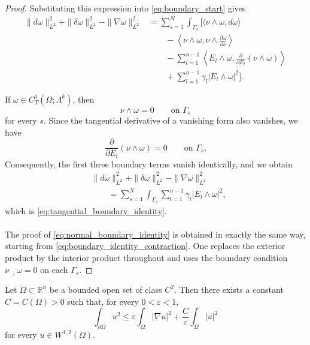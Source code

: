 \begin{proof}
Substituting this expression into \eqref{eq:boundary_start} gives
\[
\begin{aligned}
\|d\omega\|_{L^2}^2+\|\delta\omega\|_{L^2}^2-\|\nabla\omega\|_{L^2}^2
&=
\sum_{s=1}^N
\int_{\Gamma_s}
\Bigg[
\langle\nu\wedge\omega,d\omega\rangle
\\
&\qquad-
\left\langle
\nu\wedge\omega,
\nu\wedge\frac{\partial\omega}{\partial\nu}
\right\rangle
\\
&\qquad-
\sum_{l=1}^{n-1}
\left\langle
E_l\wedge\omega,
\frac{\partial}{\partial E_l}
(\nu\wedge\omega)
\right\rangle
\\
&\qquad+
\sum_{l=1}^{n-1}
\gamma_l|E_l\wedge\omega|^2
\Bigg].
\end{aligned}
\]

If $\omega\in C_T^1(\Omega;\Lambda^k)$, then
\[
\nu\wedge\omega=0
\qquad\text{on }\Gamma_s
\]
for every $s$. Since the tangential derivative of a vanishing form
also vanishes, we have
\[
\frac{\partial}{\partial E_l}(\nu\wedge\omega)=0
\qquad\text{on }\Gamma_s.
\]
Consequently, the first three boundary terms vanish identically, and
we obtain
\[
\begin{aligned}
&\|d\omega\|_{L^2}^2+\|\delta\omega\|_{L^2}^2-\|\nabla\omega\|_{L^2}^2
\\
&\qquad=
\sum_{s=1}^N
\int_{\Gamma_s}
\sum_{l=1}^{n-1}
\gamma_l|E_l\wedge\omega|^2,
\end{aligned}
\]
which is \eqref{eq:tangential_boundary_identity}.
\\\\ The proof of \eqref{eq:normal_boundary_identity} is obtained in
exactly the same way, starting from
\eqref{eq:boundary_identity_contraction}. One replaces the exterior
product by the interior product throughout and uses the boundary
condition $\nu\lrcorner\omega=0$ on each $\Gamma_s$.
\end{proof}

\begin{proposition}
\label{prop:trace_estimate}
Let $\Omega\subset\mathbb{R}^n$ be a bounded open set of class $C^2$.
Then there exists a constant $C=C(\Omega)>0$ such that, for every
$0<\varepsilon<1$,
\[
    \int_{\partial\Omega}u^2
    \leq
    \varepsilon\int_\Omega |\nabla u|^2
    +
    \frac{C}{\varepsilon}\int_\Omega |u|^2
\]
for every $u\in W^{1,2}(\Omega)$.
\end{proposition}

